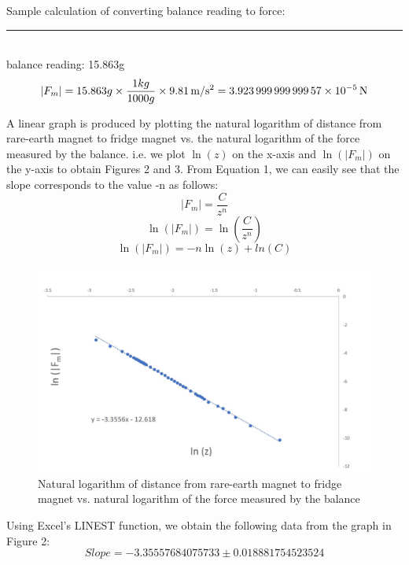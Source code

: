 \documentclass[letterpaper]{article}
\begin{document}
\noindent Sample calculation of converting balance reading to force:
\\\rule{10cm}{0.01cm}
\\
balance reading: 15.863g
$$|F_m|=15.863g\times\frac{1kg}{1000g}\times\SI{9.81}{\metre\per\second^2}=\SI{3.92399999999957E-05}{\newton}$$

A linear graph is produced by plotting the natural logarithm of distance from rare-earth magnet to fridge magnet vs. the natural logarithm of the force measured by the balance.
i.e. we plot $\ln(z)$ on the x-axis and $\ln(|F_m|)$ on the y-axis to obtain Figures 2 and 3.
From Equation 1, we can easily see that the slope corresponds to the value -n as follows:
$$|F_m|=\frac{C}{z^n}$$
$$\ln(|F_m|)=\ln\left(\frac{C}{z^n}\right)$$
$$\ln(|F_m|)=-n\ln(z)+ln(C)$$

\begin{figure}[H]
 \centering
 \includegraphics[width=\textwidth]{ferromagnet.jpg}
 \caption{Natural logarithm of distance from rare-earth magnet to fridge magnet vs. natural logarithm of the force measured by the balance }
\end{figure}

\noindent Using Excel's LINEST function, we obtain the following data from the graph in Figure 2:
$$Slope =-3.35557684075733 \pm 0.018881754523524 $$
\end{document}
